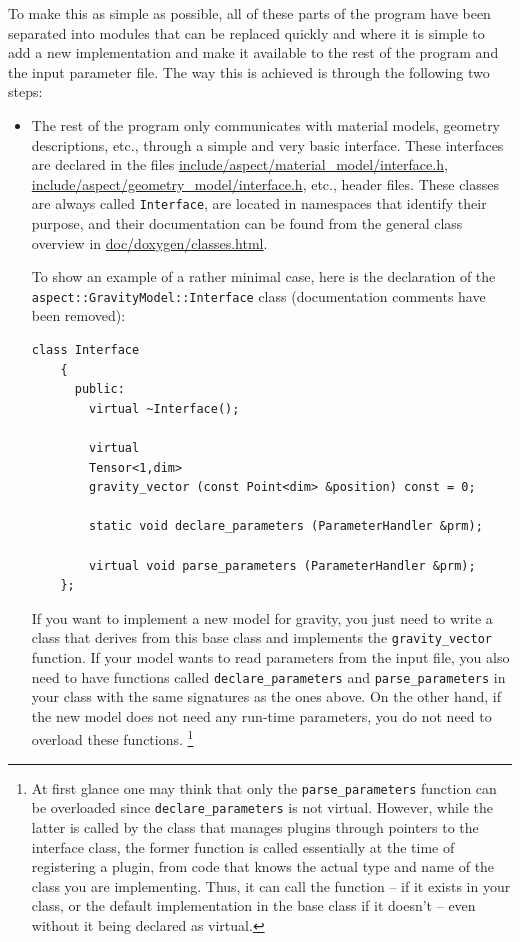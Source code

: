 \documentclass{article}
\begin{document}
To make this as simple as possible, all of these parts of the program have
been separated into modules that can be replaced quickly and where it is
simple to add a new implementation and make it available to the rest of the
program and the input parameter file. The way this is achieved is through the
following two steps:
\begin{itemize}
\item The rest of the program only communicates with material models,
  geometry descriptions, etc., through a simple and very basic
  interface. These interfaces are declared in the files
  \url{include/aspect/material_model/interface.h},
  \url{include/aspect/geometry_model/interface.h}, etc., header files. These
  classes are always called \texttt{Interface}, are located in namespaces that
  identify their purpose, and their documentation can be found from the
  general class overview in \url{doc/doxygen/classes.html}.

  To show an example of a rather minimal case, here is the declaration of the
  \texttt{aspect::GravityModel::Interface} class (documentation comments have
  been removed):
  \begin{lstlisting}[frame=single]
    class Interface
    {
      public:
        virtual ~Interface();

        virtual
        Tensor<1,dim>
        gravity_vector (const Point<dim> &position) const = 0;

        static void declare_parameters (ParameterHandler &prm);

        virtual void parse_parameters (ParameterHandler &prm);
    };
  \end{lstlisting}

  If you want to implement a new model for gravity, you just need to write a
  class that derives from this base class and implements the
  \texttt{gravity\_vector} function. If your model wants to read parameters
  from the input file, you also need to have functions called
  \texttt{declare\_parameters} and \texttt{parse\_parameters} in your class
  with the same signatures as the ones above. On the other hand, if the new
  model does not need any run-time parameters, you do not need to overload
  these functions.%
  \footnote{At first glance one may think that only the
    \texttt{parse\_parameters} function can be overloaded since
    \texttt{declare\_parameters} is not virtual. However, while the latter is
    called by the class that manages plugins through pointers to the interface
    class, the former function is called essentially at the time of
    registering a plugin, from code that knows the actual type and name of the
    class you are implementing. Thus, it can call the function -- if it exists
    in your class, or the default implementation in the base class if it doesn't
    -- even without it being declared as virtual.}


\end{itemize}
\end{document}
